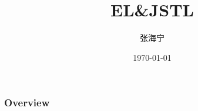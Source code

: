 \documentclass{beamer}
\title[EL\&JSTL]{EL\&JSTL} %
\author{张海宁} %
\institute[gzu] %
{
贵州大学 \\ %
\medskip
\textit{hnzhang1@gzu.edu.cn} %
}
\date{\today} %
\begin{document}
\begin{frame}
\titlepage %
\end{frame}

\begin{frame}
\frametitle{Overview} %
\tableofcontents %
\end{frame}


\end{document}
